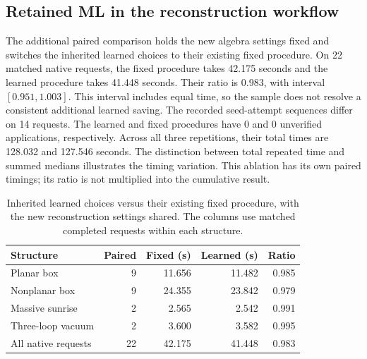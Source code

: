 \subsection{Retained ML in the reconstruction workflow}
The additional paired comparison holds the new algebra settings fixed and switches the inherited learned choices to their existing fixed procedure. On 22 matched native requests, the fixed procedure takes 42.175 seconds and the learned procedure takes 41.448 seconds. Their ratio is 0.983, with interval $[0.951,1.003]$. This interval includes equal time, so the sample does not resolve a consistent additional learned saving. The recorded seed-attempt sequences differ on 14 requests. The learned and fixed procedures have 0 and 0 unverified applications, respectively. Across all three repetitions, their total times are 128.032 and 127.546 seconds. The distinction between total repeated time and summed medians illustrates the timing variation. This ablation has its own paired timings; its ratio is not multiplied into the cumulative result.

\begin{table}[!htbp]\centering\small
\caption{Inherited learned choices versus their existing fixed procedure, with the new reconstruction settings shared. The columns use matched completed requests within each structure.}
\label{tab:reconstruction-retained}
\begin{tabularx}{\linewidth}{@{}Yrrrr@{}}\toprule
Structure & Paired & Fixed (s) & Learned (s) & Ratio\\\midrule
Planar box & 9 & 11.656 & 11.482 & 0.985 \\
Nonplanar box & 9 & 24.355 & 23.842 & 0.979 \\
Massive sunrise & 2 & 2.565 & 2.542 & 0.991 \\
Three-loop vacuum & 2 & 3.600 & 3.582 & 0.995 \\
All native requests & 22 & 42.175 & 41.448 & 0.983 \\
\bottomrule\end{tabularx}\end{table}



